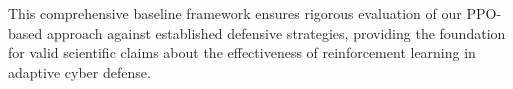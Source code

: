 \documentclass[12pt,oneside]{article}
\begin{document}

This comprehensive baseline framework ensures rigorous evaluation of our PPO-based approach against established defensive strategies, providing the foundation for valid scientific claims about the effectiveness of reinforcement learning in adaptive cyber defense.
\end{document}
